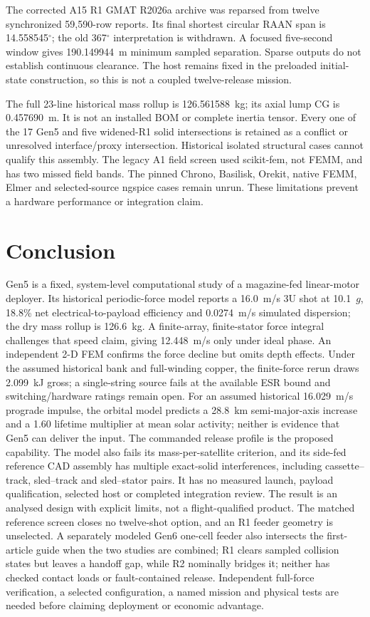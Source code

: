 \documentclass[conference]{IEEEtran}
\begin{document}
The corrected A15 R1 GMAT R2026a archive was reparsed from twelve synchronized 59,590-row reports. Its final shortest circular RAAN span is 14.558545$^\circ$; the old 367$^\circ$ interpretation is withdrawn. A focused five-second window gives 190.149944~m minimum sampled separation. Sparse outputs do not establish continuous clearance. The host remains fixed in the preloaded initial-state construction, so this is not a coupled twelve-release mission.

The full 23-line historical mass rollup is 126.561588~kg; its axial lump CG is 0.457690~m. It is not an installed BOM or complete inertia tensor. Every one of the 17 Gen5 and five widened-R1 solid intersections is retained as a conflict or unresolved interface/proxy intersection. Historical isolated structural cases cannot qualify this assembly. The legacy A1 field screen used scikit-fem, not FEMM, and has two missed field bands. The pinned Chrono, Basilisk, Orekit, native FEMM, Elmer and selected-source ngspice cases remain unrun. These limitations prevent a hardware performance or integration claim.

\section{Conclusion}
Gen5 is a fixed, system-level computational study of a magazine-fed linear-motor deployer. Its historical periodic-force model reports a 16.0~m/s 3U shot at 10.1~$g$, 18.8\% net electrical-to-payload efficiency and 0.0274~m/s simulated dispersion; the dry mass rollup is 126.6~kg. A finite-array, finite-stator force integral challenges that speed claim, giving 12.448~m/s only under ideal phase. An independent 2-D FEM confirms the force decline but omits depth effects. Under the assumed historical bank and full-winding copper, the finite-force rerun draws 2.099~kJ gross; a single-string source fails at the available ESR bound and switching/hardware ratings remain open. For an assumed historical 16.029~m/s prograde impulse, the orbital model predicts a 28.8~km semi-major-axis increase and a 1.60 lifetime multiplier at mean solar activity; neither is evidence that Gen5 can deliver the input. The commanded release profile is the proposed capability. The model also fails its mass-per-satellite criterion, and its side-fed reference CAD assembly has multiple exact-solid interferences, including cassette--track, sled--track and sled--stator pairs. It has no measured launch, payload qualification, selected host or completed integration review. The result is an analysed design with explicit limits, not a flight-qualified product. The matched reference screen closes no twelve-shot option, and an R1 feeder geometry is unselected. A separately modeled Gen6 one-cell feeder also intersects the first-article guide when the two studies are combined; R1 clears sampled collision states but leaves a handoff gap, while R2 nominally bridges it; neither has checked contact loads or fault-contained release. Independent full-force verification, a selected configuration, a named mission and physical tests are needed before claiming deployment or economic advantage.
\end{document}
